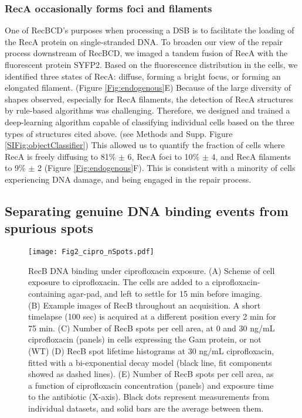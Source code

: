 \subsubsection*{RecA occasionally forms foci and filaments}
One of RecBCD's purposes when processing a DSB is to facilitate the loading of the RecA protein on single-stranded DNA. To broaden our view of the repair process downstream of RecBCD, we imaged a tandem fusion of RecA with the fluorescent protein SYFP2.\cite{} Based on the fluorescence distribution in the cells, we identified three states of RecA: diffuse, forming a bright focus, or forming an elongated filament. (Figure \ref{Fig:endogenous}E) Because of the large diversity of shapes observed, especially for RecA filaments, the detection of RecA structures by rule-based algorithms was challenging. Therefore, we designed and trained a deep-learning algorithm capable of classifying individual cells based on the three types of structures cited above. (see Methods and Supp. Figure \ref{SIFig:objectClassifier}) This allowed us to quantify the fraction of cells where RecA is freely diffusing to 81\% $\pm$ 6, RecA foci to 10\% $\pm$ 4, and RecA filaments to 9\% $\pm$ 2 (Figure \ref{Fig:endogenous}F). This is consistent with a minority of cells experiencing DNA damage, and being engaged in the repair process.


\subsection*{Separating genuine DNA binding events from spurious spots}

\begin{figure*}[htbp]
\begin{center}
\texttt{[image: Fig2\_cipro\_nSpots.pdf]}
\end{center}
\caption{RecB DNA binding under ciprofloxacin exposure. (A) Scheme of cell exposure to ciprofloxacin. The cells are added to a ciprofloxacin-containing agar-pad, and left to settle for 15 min before imaging. (B) Example images of RecB throughout an acquisition. A short timelapse (100 sec) is acquired at a different position every 2 min for 75 min. (C) Number of RecB spots per cell area, at 0 and 30 ng/mL ciprofloxacin (panels) in cells expressing the Gam protein, or not (WT) (D) RecB spot lifetime histograms at 30 ng/mL ciprofloxacin, fitted with a bi-exponential decay model (black line, fit components showed as dashed lines). (E) Number of RecB spots per cell area, as a function of ciprofloxacin concentration (panels) and exposure time to the antibiotic (X-axis). Black dots represent measurements from individual datasets, and solid bars are the average between them.}
\label{Fig:nspots}
\end{figure*}


